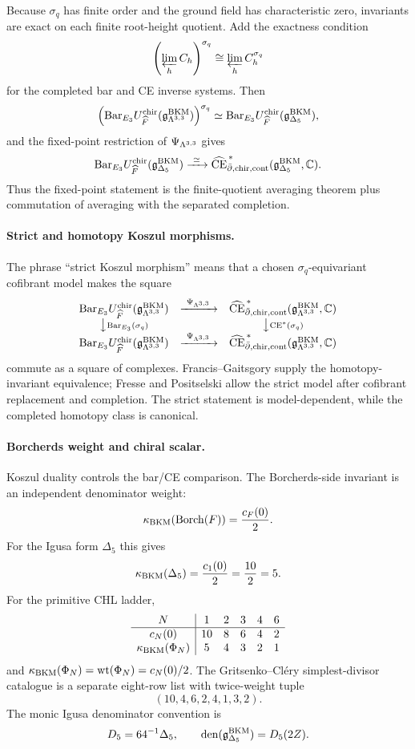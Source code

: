 Because $\sigma_q$ has finite order and the ground field has
characteristic zero, invariants are exact on each finite root-height
quotient.  Add the exactness condition
\[
  \left(\varprojlim_h C_h\right)^{\sigma_q}
  \cong
  \varprojlim_h C_h^{\sigma_q}
\]
for the completed bar and CE inverse systems.  Then
\[
  \left(
    \mathrm{Bar}_{E_3}
    U^{\mathrm{chir}}_{\widehat F}(\mathfrak{g}^{\mathrm{BKM}}_{\Lambda^{3,3}})
  \right)^{\sigma_q}
  \simeq
  \mathrm{Bar}_{E_3}
  U^{\mathrm{chir}}_{\widehat F}(\mathfrak{g}^{\mathrm{BKM}}_{\Delta_5}),
\]
and the fixed-point restriction of $\Psi_{\Lambda^{3,3}}$ gives
\[
  \mathrm{Bar}_{E_3}
  U^{\mathrm{chir}}_{\widehat F}(\mathfrak{g}^{\mathrm{BKM}}_{\Delta_5})
  \xrightarrow{\ \simeq\ }
  \widehat{\mathrm{CE}}^{\,*}_{\bar\partial,\mathrm{chir},\mathrm{cont}}
  (\mathfrak{g}^{\mathrm{BKM}}_{\Delta_5},\mathbb{C}).
\]
Thus the fixed-point statement is the finite-quotient averaging theorem
plus commutation of averaging with the separated completion.

\paragraph{Strict and homotopy Koszul morphisms.}
The phrase ``strict Koszul morphism'' means that a chosen
$\sigma_q$-equivariant cofibrant model makes the square
\[
\begin{array}{ccc}
  \mathrm{Bar}_{E_3}U^{\mathrm{chir}}_{\widehat F}(\mathfrak{g}^{\mathrm{BKM}}_{\Lambda^{3,3}})
  & \xrightarrow{\ \Psi_{\Lambda^{3,3}}\ } &
  \widehat{\mathrm{CE}}^{\,*}_{\bar\partial,\mathrm{chir},\mathrm{cont}}
  (\mathfrak{g}^{\mathrm{BKM}}_{\Lambda^{3,3}},\mathbb{C}) \\
  \big\downarrow{\scriptstyle \mathrm{Bar}_{E_3}(\sigma_q)}
  && \big\downarrow{\scriptstyle \mathrm{CE}^*(\sigma_q)} \\
  \mathrm{Bar}_{E_3}U^{\mathrm{chir}}_{\widehat F}(\mathfrak{g}^{\mathrm{BKM}}_{\Lambda^{3,3}})
  & \xrightarrow{\ \Psi_{\Lambda^{3,3}}\ } &
  \widehat{\mathrm{CE}}^{\,*}_{\bar\partial,\mathrm{chir},\mathrm{cont}}
  (\mathfrak{g}^{\mathrm{BKM}}_{\Lambda^{3,3}},\mathbb{C})
\end{array}
\]
commute as a square of complexes.  Francis--Gaitsgory supply the
homotopy-invariant equivalence; Fresse and Positselski allow the strict
model after cofibrant replacement and completion.  The strict statement
is model-dependent, while the completed homotopy class is canonical.

\paragraph{Borcherds weight and chiral scalar.}
Koszul duality controls the bar/CE comparison.  The Borcherds-side
invariant is an independent denominator weight:
\[
  \kappa_{\mathrm{BKM}}(\operatorname{Borch}(F))=\frac{c_F(0)}{2}.
\]
For the Igusa form $\Delta_5$ this gives
\[
  \kappa_{\mathrm{BKM}}(\Delta_5)=\frac{c_1(0)}{2}=\frac{10}{2}=5.
\]
For the primitive CHL ladder,
\[
\begin{array}{c|ccccc}
N & 1 & 2 & 3 & 4 & 6\\ \hline
c_N(0) & 10 & 8 & 6 & 4 & 2\\
\kappa_{\mathrm{BKM}}(\Phi_N) & 5 & 4 & 3 & 2 & 1
\end{array}
\]
and $\kappa_{\mathrm{BKM}}(\Phi_N)=\operatorname{wt}(\Phi_N)=c_N(0)/2$.
The Gritsenko--Cl\'ery simplest-divisor catalogue is a separate
eight-row list with twice-weight tuple
\[
  (10,4,6,2,4,1,3,2).
\]
The monic Igusa denominator convention is
\[
  D_5=64^{-1}\Delta_5,\qquad
  \operatorname{den}(\mathfrak{g}^{\mathrm{BKM}}_{\Delta_5})=D_5(2Z).
\]

